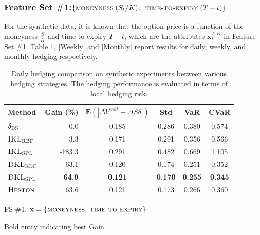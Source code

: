 \documentclass[letterpaper,12pt,titlepage,oneside,final]{book}
\numberwithin{equation}{section}
\theoremstyle{definition}
\newcommand{\vx}{\mathbf{x}}
\newcommand{\E}{\mathbf{E}}
\newcommand{\DS}{\Delta S}
\newcommand{\Heston}{\textsc{Heston}}
\newcommand{\DVmkt}{\Delta V^{mkt}}
\newcommand{\MeanAbs}{\E(|\DVmkt-\DS \delta |)}
\newcommand{\DKLs}{\bf\textsc{DKL}_{\text{SPL}}}
\newcommand{\DKLg}{\bf\textsc{DKL}_{\text{RBF}}}
\newcommand{\IKLs}{\bf\textsc{IKL}_{\text{SPL}}}
\newcommand{\IKLg}{\bf\textsc{IKL}_{\text{RBF}}}
\newcommand{\Del}{\delta_{\textsc{BS}}}
\begin{document}
\subsubsection{Feature Set \#1:$ \{\textsc{moneyness} \;(S_t/K),\;\;\textsc{time-to-expiry} \;(T-t)\}$}
For the synthetic data, it is known that the option price is a function of
 the moneyness $ \frac{S}{K}$ and time to expiry $T-t$, which are the attributes $\vx_{t}^{T,K}$ in Feature Set \#1. Table \ref{Daily}, \ref{Weekly} and \ref{Monthly} report results for daily, weekly, and monthly hedging respectively.

 \begin{table}[htp!]
\begin{center}
\begin{threeparttable}
\begin{tabular}{|l|r c c c c|}
\hline
Method & Gain (\%)& $\MeanAbs$ & Std& VaR & CVaR   \\ \hline
$\Del$ & 0.0 & 0.185 & 0.286 & 0.380 & 0.574 \\
$\IKLg$  & -3.3 & 0.171 & 0.291 & 0.356 & 0.566 \\
$\IKLs$  & -183.3 & 0.291 & 0.482 & 0.669 & 1.105 \\
$\DKLg$  & 63.1 & 0.120 & 0.174 & 0.251 & 0.352 \\
$\DKLs$  & \textbf{64.9} & \textbf{0.121} & \textbf{0.170} & \textbf{0.255} & \textbf{0.345} \\
$\Heston$ & 63.6 & 0.121 & 0.173 & 0.266 & 0.360 \\
\hline
\end{tabular}
\caption{Daily hedging comparison on synthetic experiments between various hedging strategies. The hedging performance is evaluated in terms of local hedging risk.}
\label{Daily}
 \begin{tablenotes}
    \small
  \item[1] FS \#1: $\vx=\{\textsc{moneyness,~time-to-expiry}\}$
  \item[2] Bold entry indicating best Gain
  \end{tablenotes}
  \end{threeparttable}
\end{center}
\end{table}
\end{document}
